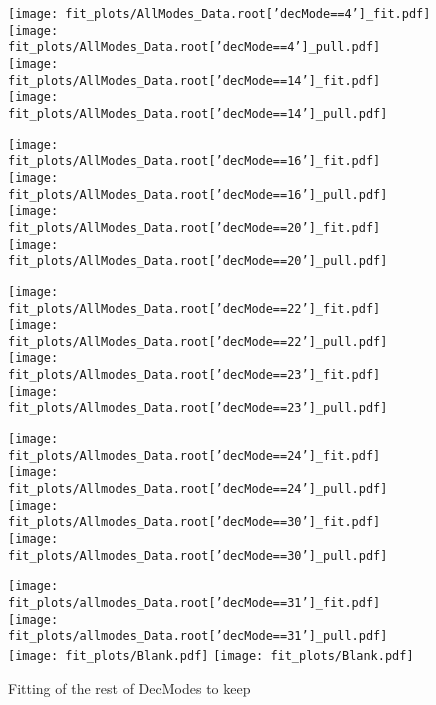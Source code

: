 \begin{figure}[h!]
\begin{center}
\texttt{[image: fit\_plots/AllModes\_Data.root['decMode==4']\_fit.pdf]}
\texttt{[image: fit\_plots/AllModes\_Data.root['decMode==4']\_pull.pdf]}
\texttt{[image: fit\_plots/AllModes\_Data.root['decMode==14']\_fit.pdf]}
\texttt{[image: fit\_plots/AllModes\_Data.root['decMode==14']\_pull.pdf]}

\texttt{[image: fit\_plots/AllModes\_Data.root['decMode==16']\_fit.pdf]}
\texttt{[image: fit\_plots/AllModes\_Data.root['decMode==16']\_pull.pdf]}
\texttt{[image: fit\_plots/AllModes\_Data.root['decMode==20']\_fit.pdf]}
\texttt{[image: fit\_plots/AllModes\_Data.root['decMode==20']\_pull.pdf]}

\texttt{[image: fit\_plots/AllModes\_Data.root['decMode==22']\_fit.pdf]}
\texttt{[image: fit\_plots/AllModes\_Data.root['decMode==22']\_pull.pdf]}
\texttt{[image: fit\_plots/Allmodes\_Data.root['decMode==23']\_fit.pdf]}
\texttt{[image: fit\_plots/Allmodes\_Data.root['decMode==23']\_pull.pdf]}

\texttt{[image: fit\_plots/Allmodes\_Data.root['decMode==24']\_fit.pdf]}
\texttt{[image: fit\_plots/Allmodes\_Data.root['decMode==24']\_pull.pdf]}
\texttt{[image: fit\_plots/Allmodes\_Data.root['decMode==30']\_fit.pdf]}
\texttt{[image: fit\_plots/Allmodes\_Data.root['decMode==30']\_pull.pdf]}

\texttt{[image: fit\_plots/allmodes\_Data.root['decMode==31']\_fit.pdf]}
\texttt{[image: fit\_plots/allmodes\_Data.root['decMode==31']\_pull.pdf]}
\texttt{[image: fit\_plots/Blank.pdf]}
\texttt{[image: fit\_plots/Blank.pdf]}
\caption{Fitting of the rest of DecModes to keep}
\end{center}
\end{figure}

